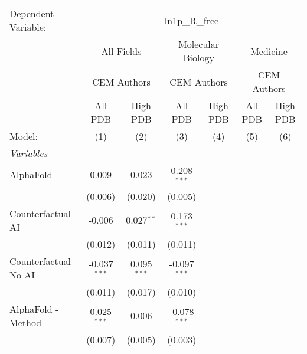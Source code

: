 \begingroup
\centering
\begin{tabular}{lcccccc}
   \tabularnewline \midrule \midrule
   Dependent Variable: & \multicolumn{6}{c}{ln1p\_R\_free}\\
 & \multicolumn{2}{c}{All Fields} & \multicolumn{2}{c}{Molecular Biology} & \multicolumn{2}{c}{Medicine} \\
\cmidrule(lr){2-3} \cmidrule(lr){4-5} \cmidrule(lr){6-7}
 & \multicolumn{2}{c}{CEM Authors} & \multicolumn{2}{c}{CEM Authors} & \multicolumn{2}{c}{CEM Authors} \\
\cmidrule(lr){2-3} \cmidrule(lr){4-5} \cmidrule(lr){6-7}
 & \multicolumn{1}{c}{All PDB} & \multicolumn{1}{c}{High PDB} & \multicolumn{1}{c}{All PDB} & \multicolumn{1}{c}{High PDB} & \multicolumn{1}{c}{All PDB} & \multicolumn{1}{c}{High PDB} \\
\cmidrule(lr){2-2} \cmidrule(lr){3-3} \cmidrule(lr){4-4} \cmidrule(lr){5-5} \cmidrule(lr){6-6} \cmidrule(lr){7-7}
   Model:                                                     & (1)            & (2)           & (3)            & (4) & (5) & (6)\\  
   \midrule
   \emph{Variables}\\
   AlphaFold                                                  & 0.009          & 0.023         & 0.208$^{***}$  &     &     &   \\   
                                                              & (0.006)        & (0.020)       & (0.005)        &     &     &   \\   
   Counterfactual AI                                          & -0.006         & 0.027$^{**}$  & 0.173$^{***}$  &     &     &   \\   
                                                              & (0.012)        & (0.011)       & (0.011)        &     &     &   \\   
   Counterfactual No AI                                       & -0.037$^{***}$ & 0.095$^{***}$ & -0.097$^{***}$ &     &     &   \\   
                                                              & (0.011)        & (0.017)       & (0.010)        &     &     &   \\   
   AlphaFold - Method                                         & 0.025$^{***}$  & 0.006         & -0.078$^{***}$ &     &     &   \\   
                                                              & (0.007)        & (0.005)       & (0.003)        &     &     &   \\   

\end{tabular}
